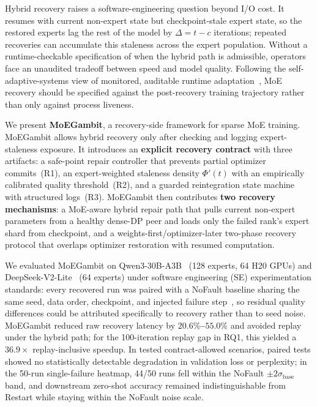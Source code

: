 \documentclass[10pt,conference]{IEEEtran}
\begin{document}
Hybrid recovery raises a software-engineering question beyond I/O cost. It resumes with current non-expert state but checkpoint-stale expert state, so the restored experts lag the rest of the model by $\Delta=t-c$ iterations; repeated recoveries can accumulate this staleness across the expert population. Without a runtime-checkable specification of when the hybrid path is admissible, operators face an unaudited tradeoff between speed and model quality. Following the self-adaptive-systems view of monitored, auditable runtime adaptation~\cite{kephart2003autonomic,garlan2004rainbow,salehie2009selfadaptive}, MoE recovery should be specified against the post-recovery training trajectory rather than only against process liveness.

We present \textbf{MoEGambit}, a recovery-side framework for sparse MoE training. MoEGambit allows hybrid recovery only after checking and logging expert-staleness exposure. It introduces an \textbf{explicit recovery contract} with three artifacts: a safe-point repair controller that prevents partial optimizer commits~(R1), an expert-weighted staleness density $\Phi'(t)$ with an empirically calibrated quality threshold~(R2), and a guarded reintegration state machine with structured logs~(R3). MoEGambit then contributes \textbf{two recovery mechanisms}: a MoE-aware hybrid repair path that pulls current non-expert parameters from a healthy dense-DP peer and loads only the failed rank's expert shard from checkpoint, and a weights-first/optimizer-later two-phase recovery protocol that overlaps optimizer restoration with resumed computation.

We evaluated MoEGambit on Qwen3-30B-A3B~\cite{qwen3report} (128 experts, 64 H20 GPUs) and DeepSeek-V2-Lite~\cite{deepseekv2} (64 experts) under software engineering (SE) experimentation standards: every recovered run was paired with a NoFault baseline sharing the same seed, data order, checkpoint, and injected failure step~\cite{wohlin2012ese,arcuri2014hitchhiker}, so residual quality differences could be attributed specifically to recovery rather than to seed noise. MoEGambit reduced raw recovery latency by \textbf{$20.6\%$--$55.0\%$} and avoided replay under the hybrid path; for the 100-iteration replay gap in RQ1, this yielded a \textbf{$36.9\times$} replay-inclusive speedup. In tested contract-allowed scenarios, paired tests showed no statistically detectable degradation in validation loss or perplexity; in the 50-run single-failure heatmap, 44/50 runs fell within the NoFault $\pm2\sigma_{\text{base}}$ band, and downstream zero-shot accuracy remained indistinguishable from Restart while staying within the NoFault noise scale.
\end{document}
